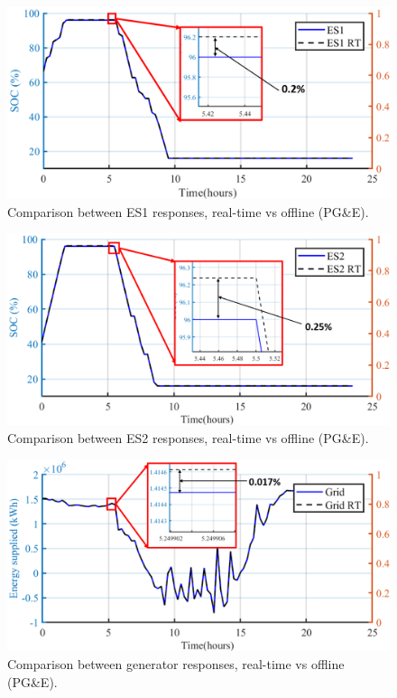 \begin{figure}[!ht]
\centering
\includegraphics[width = \linewidth]{figs/A82/PGNE_RT_OFF_ES1.png}
\caption{Comparison between ES1 responses, real-time vs offline (PG\&E).}
\label{fig:PGNE1_NM_ES1_Z_RT}
\end{figure}

\begin{figure}[!ht]
\centering
\includegraphics[width = \linewidth]{figs/A82/PGNE_RT_OFF_ES2.png}
\caption{Comparison between ES2 responses, real-time vs offline (PG\&E).}
\label{fig:PGNE1_NM_ES2_Z_RT}
\end{figure}

\begin{figure}[!ht]
\centering
\includegraphics[width = \linewidth]{figs/A82/PGNE_RT_OFF_GEN.png}
\caption{Comparison between generator responses, real-time vs offline (PG\&E).}
\label{fig:PGNE1_NM_GEN_Z_RT}
\end{figure}